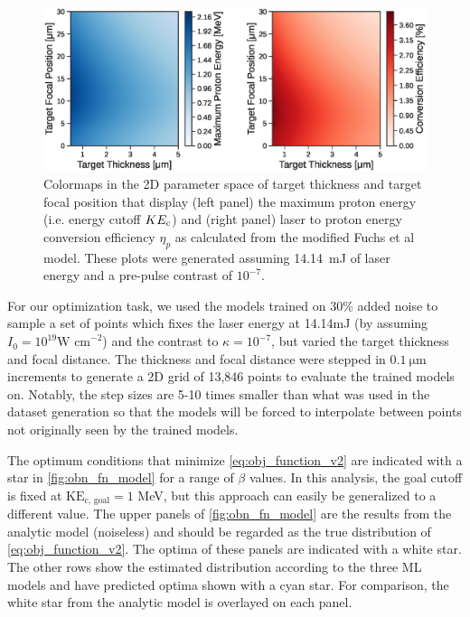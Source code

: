 \begin{figure}
	\centering
	\includegraphics[width=6in]{planning/images/paper2/fig6.eps}
	\caption{Colormaps in the 2D parameter space of target thickness and target focal position that display (left panel) the maximum proton energy (i.e. energy cutoff $KE_{\rm c}$) and (right panel) laser to proton energy conversion efficiency $\eta_{p}$ as calculated from the modified Fuchs et al model. These plots were generated assuming 14.14~mJ of laser energy and a pre-pulse contrast of $10^{-7}$.}
	\label{fig:energy_efficiency}
\end{figure}

For our optimization task, we used the models trained on 30\% added noise to sample a set of points which fixes the laser energy at 14.14mJ (by assuming $I_0 = 10^{19} \text{W cm}^{-2}$) and the contrast to $\kappa = 10^{-7}$, but varied the target thickness and focal distance. The thickness and focal distance were stepped in $\SI{0.1}{\micro \meter}$ increments to generate a 2D grid of 13,846 points to evaluate the trained models on. Notably, the step sizes are 5-10 times smaller than what was used in the dataset generation so that the models will be forced to interpolate between points not originally seen by the trained models. 

The optimum conditions that minimize \autoref{eq:obj_function_v2} are indicated with a star in \autoref{fig:obn_fn_model} for a range of $\beta$ values. In this analysis, the goal cutoff is fixed at $\text{KE}_\text{c, goal} = 1$ MeV, but this approach can easily be generalized to a different value. The upper panels of \autoref{fig:obn_fn_model} are the results from the analytic model (noiseless) and should be regarded as the true distribution of \autoref{eq:obj_function_v2}. The optima of these panels are indicated with a white star. The other rows show the estimated distribution according to the three \gls{ML} models and have predicted optima shown with a cyan star. For comparison, the white star from the analytic model is overlayed on each panel.

